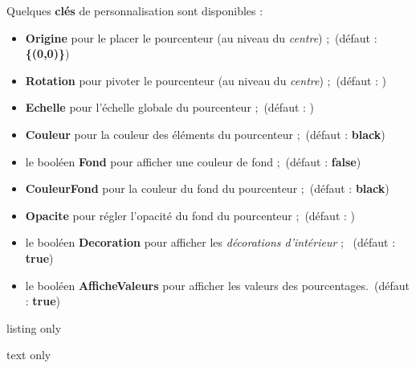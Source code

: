 \documentclass[french,a4paper,11pt]{article}
\newcommand\Cle[1]{{\bfseries\sffamily\textlangle #1\textrangle}}
\newcommand\affichegrille[4]{%
	\draw[xstep=1,ystep=1,lightgray] (#1,#3) grid (#2,#4) ;
	\foreach \x in {#1,\inteval{1+#1},...,#2} {\draw[lightgray] (\x,#4)--++(0,3pt) node[font=\scriptsize,above] {$\x$} ;}
	\foreach \y in {#3,\inteval{1+#3},...,#4} {\draw[lightgray] (#1,\y)--++(-3pt,0) node[font=\scriptsize,left] {$\y$} ;}
}
\newcommand\pointsutiles[1]{%
	\foreach \point in {#1} {\draw[thick,fill=red] \point circle[radius=3pt] ;}
}
\begin{document}
\begin{tipblock}
Quelques \Cle{clés} de personnalisation sont disponibles :

\begin{itemize}
	\item \Cle{Origine} pour le placer le pourcenteur (au niveau du \textit{centre}) ;\hfill~(défaut : \Cle{\{(0,0)\}})
	\item \Cle{Rotation} pour pivoter le pourcenteur (au niveau du \textit{centre}) ;\hfill~(défaut : \Cle{0})
	\item \Cle{Echelle} pour l'échelle globale du pourcenteur ;\hfill~(défaut : \Cle{1})
	\item \Cle{Couleur} pour la couleur des éléments du pourcenteur ;\hfill~(défaut : \Cle{black})
	\item le booléen \Cle{Fond} pour afficher une couleur de fond ;\hfill~(défaut : \Cle{false})
	\item \Cle{CouleurFond} pour la couleur du fond du pourcenteur ;\hfill~(défaut : \Cle{black})
	\item \Cle{Opacite} pour régler l'opacité du fond du pourcenteur ;\hfill~(défaut : \Cle{0.5})
	\item le booléen \Cle{Decoration} pour afficher les \textit{décorations d'intérieur} ; \hfill~(défaut : \Cle{true})
	\item le booléen \Cle{AfficheValeurs} pour afficher les valeurs des pourcentages.\hfill~(défaut : \Cle{true})
\end{itemize}
\vspace*{-\baselineskip}\leavevmode
\end{tipblock}

\pagebreak

\begin{PresentationCode}{listing only}
\tkzPourcenteur[Fond,CouleurFond=purple]
\tkzPourcenteur[Origine={(7,1)},Rotation=-45,Couleur=ForestGreen,Echelle=0.75]
\tkzPourcenteur[Decoration=false,AfficheValeurs=false,Origine={(9,-4)},Rotation=30, Couleur=DarkBlue,Fond,CouleurFond=DarkBlue,Echelle=0.66]
\tkzPourcenteur[Origine={(3,-4)},Rotation=90,Couleur=orange,Fond,CouleurFond=orange, Echelle=0.33]
\end{PresentationCode}

\begin{PresentationCode}{text only}
\end{PresentationCode}
\end{document}
